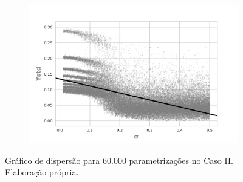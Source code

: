 \begin{figure}[H]
                \begin{subfigure}[b]{0.49\textwidth}
            \includegraphics[width=\textwidth]{ims/sigmaregression/sigmasigma.png}
    \end{subfigure}
    \caption{Gráfico de dispersão para 60.000 parametrizações no Caso II.
      Elaboração própria.}\label{fig:scatter2}
\end{figure}


